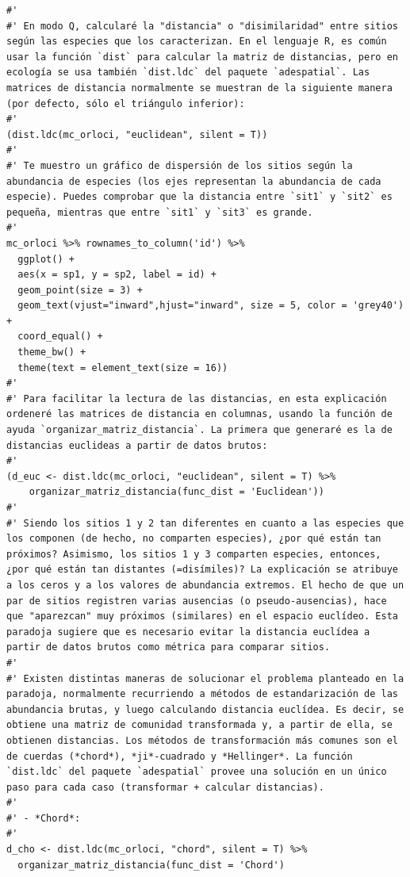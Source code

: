 \documentclass[11pt,]{article}
\begin{document}
\begin{verbatim}
#' 
#' En modo Q, calcularé la "distancia" o "disimilaridad" entre sitios según las especies que los caracterizan. En el lenguaje R, es común usar la función `dist` para calcular la matriz de distancias, pero en ecología se usa también `dist.ldc` del paquete `adespatial`. Las matrices de distancia normalmente se muestran de la siguiente manera (por defecto, sólo el triángulo inferior):
#' 
(dist.ldc(mc_orloci, "euclidean", silent = T))
#' 
#' Te muestro un gráfico de dispersión de los sitios según la abundancia de especies (los ejes representan la abundancia de cada especie). Puedes comprobar que la distancia entre `sit1` y `sit2` es pequeña, mientras que entre `sit1` y `sit3` es grande.
#' 
mc_orloci %>% rownames_to_column('id') %>% 
  ggplot() +
  aes(x = sp1, y = sp2, label = id) +
  geom_point(size = 3) +
  geom_text(vjust="inward",hjust="inward", size = 5, color = 'grey40') +
  coord_equal() +
  theme_bw() +
  theme(text = element_text(size = 16))
#'
#' Para facilitar la lectura de las distancias, en esta explicación ordeneré las matrices de distancia en columnas, usando la función de ayuda `organizar_matriz_distancia`. La primera que generaré es la de distancias euclideas a partir de datos brutos:
#' 
(d_euc <- dist.ldc(mc_orloci, "euclidean", silent = T) %>%
    organizar_matriz_distancia(func_dist = 'Euclidean'))
#' 
#' Siendo los sitios 1 y 2 tan diferentes en cuanto a las especies que los componen (de hecho, no comparten especies), ¿por qué están tan próximos? Asimismo, los sitios 1 y 3 comparten especies, entonces, ¿por qué están tan distantes (=disímiles)? La explicación se atribuye a los ceros y a los valores de abundancia extremos. El hecho de que un par de sitios registren varias ausencias (o pseudo-ausencias), hace que "aparezcan" muy próximos (similares) en el espacio euclídeo. Esta paradoja sugiere que es necesario evitar la distancia euclídea a partir de datos brutos como métrica para comparar sitios.
#' 
#' Existen distintas maneras de solucionar el problema planteado en la paradoja, normalmente recurriendo a métodos de estandarización de las abundancia brutas, y luego calculando distancia euclídea. Es decir, se obtiene una matriz de comunidad transformada y, a partir de ella, se obtienen distancias. Los métodos de transformación más comunes son el de cuerdas (*chord*), *ji*-cuadrado y *Hellinger*. La función `dist.ldc` del paquete `adespatial` provee una solución en un único paso para cada caso (transformar + calcular distancias).
#' 
#' - *Chord*:
#' 
d_cho <- dist.ldc(mc_orloci, "chord", silent = T) %>%
  organizar_matriz_distancia(func_dist = 'Chord')

\end{verbatim}
\end{document}

